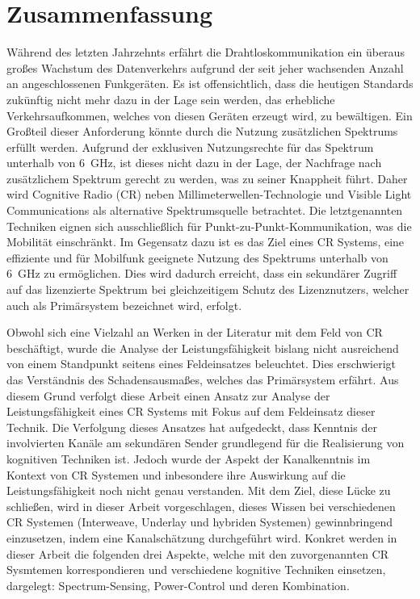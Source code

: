 \chapter*{Zusammenfassung}
W\"ahrend des letzten Jahrzehnts erf\"ahrt die Drahtloskommunikation ein \"uberaus gro\ss es Wachstum des Datenverkehrs aufgrund der seit jeher wachsenden Anzahl an angeschlossenen Funkger\"aten. Es ist offensichtlich, dass die heutigen Standards zuk\"unftig nicht mehr dazu in der Lage sein werden, das erhebliche Verkehrsaufkommen, welches von diesen Ger\"aten erzeugt wird, zu bew\"altigen. Ein Gro\ss teil dieser Anforderung k\"onnte durch die Nutzung zus\"atzlichen Spektrums erf\"ullt werden. Aufgrund der exklusiven Nutzungsrechte f\"ur das Spektrum unterhalb von \SI{6}{GHz}, ist dieses nicht dazu in der Lage, der Nachfrage nach zus\"atzlichem Spektrum gerecht zu werden, was zu seiner Knappheit f\"uhrt. Daher wird Cognitive Radio (CR) neben Millimeterwellen-Technologie und Visible Light Communications als alternative Spektrumsquelle betrachtet. Die letztgenannten Techniken eignen sich ausschlie\ss lich f\"ur Punkt-zu-Punkt-Kommunikation, was die Mobilit\"at einschr\"ankt. Im Gegensatz dazu ist es das Ziel eines CR Systems, eine effiziente und f\"ur Mobilfunk geeignete Nutzung des Spektrums unterhalb von \SI{6}{GHz} zu erm\"oglichen. Dies wird dadurch erreicht, dass ein sekund\"arer Zugriff auf das lizenzierte Spektrum bei gleichzeitigem Schutz des Lizenznutzers, welcher auch als Prim\"arsystem bezeichnet wird, erfolgt. 

Obwohl sich eine Vielzahl an Werken in der Literatur mit dem Feld von CR besch\"aftigt, wurde die Analyse der Leistungsf\"ahigkeit bislang nicht ausreichend von einem Standpunkt seitens eines Feldeinsatzes beleuchtet. Dies erschwierigt das Verständnis des Schadensausma\ss es, welches das Prim\"arsystem erf\"ahrt. Aus diesem Grund verfolgt diese Arbeit einen Ansatz zur Analyse der Leistungsf\"ahigkeit eines CR Systems mit Fokus auf dem Feldeinsatz dieser Technik. Die Verfolgung dieses Ansatzes hat aufgedeckt, dass Kenntnis der involvierten Kanäle am sekund\"aren Sender grundlegend für die Realisierung von kognitiven Techniken ist. Jedoch wurde der Aspekt der Kanalkenntnis im Kontext von CR Systemen und inbesondere ihre Auswirkung auf die Leistungsfähigkeit noch nicht genau verstanden. Mit dem Ziel, diese L\"ucke zu schlie\ss en, wird in dieser Arbeit vorgeschlagen, dieses Wissen bei verschiedenen CR Systemen (Interweave, Underlay und hybriden Systemen) gewinnbringend einzusetzen, indem eine Kanalsch\"atzung durchgef\"uhrt wird. Konkret werden in dieser Arbeit die folgenden drei Aspekte, welche mit den zuvorgenannten CR Sysmtemen korrespondieren und verschiedene kognitive Techniken einsetzen, dargelegt: Spectrum-Sensing, Power-Control und deren Kombination.

